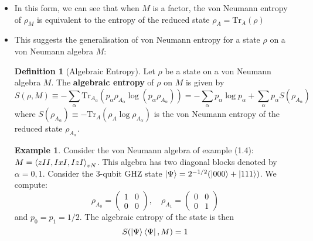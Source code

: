 \documentclass[12pt,a4paper]{article}
\numberwithin{equation}{section}
\newcommand{\ketbra}[2]{\ket{#1}\bra{#2}}
\newcommand{\ketbras}[1]{\ketbra{#1}{#1}}
\newcommand{\gen}[1]{\braket{#1}_{vN}}
\theoremstyle{definition}
\newtheorem{definition}{Definition}[section]
\theoremstyle{theorem}
\theoremstyle{example}
\newtheorem{example}{Example}[section]
\begin{document}
\begin{itemize}
		\item In this form, we can see that when $M$ is a factor, the von Neumann entropy of $\rho_{M}$ is equivalent to the entropy of the reduced state $\rho_{A}=\text{Tr}_{\overline{A}}(\rho)$
		\item This suggests the generalisation of von Neumann entropy for a state $\rho$ on a von Neumann algebra $M$:
		\begin{definition}[Algebraic Entropy]
			Let $\rho$ be a state on a von Neumann algebra $M$. The \textbf{algebraic entropy} of $\rho$ on $M$ is given by
			\begin{equation}
				S(\rho,M)\equiv-\sum_{\alpha}\text{Tr}_{A_{\alpha}}(p_{\alpha}\rho_{A_{\alpha}}\log(p_{\alpha}\rho_{A_{\alpha}}))=-\sum_{\alpha}p_{\alpha}\log{p_{\alpha}}+\sum_{\alpha}p_{\alpha}S(\rho_{A_{\alpha}})
			\end{equation}
			where $S(\rho_{A_{\alpha}})\equiv -\text{Tr}_{A}(\rho_{A}\log{\rho_{A_{\alpha}}})$ is the von Neumann entropy of the reduced state $\rho_{A_{\alpha}}$.
		\end{definition}
		\begin{example}
			Consider the von Neumann algebra of example (1.4): $M=\gen{zII,IxI,IzI}$. This algebra has two diagonal blocks denoted by $\alpha=0,1$. Consider the 3-qubit GHZ state $\ket{\Psi}=2^{-1/2}(\ket{000}+\ket{111})$. We compute:
			\begin{equation}
				\rho_{A_{0}}=\begin{pmatrix}
					1&0\\0&0
				\end{pmatrix},\quad \rho_{A_{1}}=\begin{pmatrix}
				0&0\\0&1
			\end{pmatrix}
			\end{equation}
			and $p_{0}=p_{1}=1/2$. The algebraic entropy of the state is then
			\begin{equation}
				S(\ketbras{\Psi},M)=1
			\end{equation}
		\end{example}
	\end{itemize}
\end{document}
